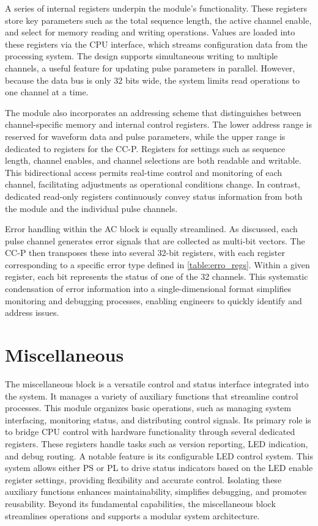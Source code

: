 A series of internal registers underpin the module's functionality. These registers store key parameters such as the total sequence length, the active channel enable, and select for memory reading and writing operations. Values are loaded into these registers via the CPU interface, which streams configuration data from the processing system. The design supports simultaneous writing to multiple channels, a useful feature for updating pulse parameters in parallel. However, because the data bus is only 32 bits wide, the system limits read operations to one channel at a time.

The module also incorporates an addressing scheme that distinguishes between channel-specific memory and internal control registers. The lower address range is reserved for waveform data and pulse parameters, while the upper range is dedicated to registers for the CC-P. Registers for settings such as sequence length, channel enables, and channel selections are both readable and writable. This bidirectional access permits real-time control and monitoring of each channel, facilitating adjustments as operational conditions change. In contrast, dedicated read-only registers continuously convey status information from both the module and the individual pulse channels.

Error handling within the AC block is equally streamlined. As discussed, each pulse channel generates error signals that are collected as multi-bit vectors. The CC-P then transposes these into several 32-bit registers, with each register corresponding to a specific error type defined in \autoref{table:erro_regs}. Within a given register, each bit represents the status of one of the 32 channels. This systematic condensation of error information into a single-dimensional format simplifies monitoring and debugging processes, enabling engineers to quickly identify and address issues.

\section{Miscellaneous}

The miscellaneous block is a versatile control and status interface integrated into the system. It manages a variety of auxiliary functions that streamline control processes. This module organizes basic operations, such as managing system interfacing, monitoring status, and distributing control signals. Its primary role is to bridge CPU control with hardware functionality through several dedicated registers. These registers handle tasks such as version reporting, LED indication, and debug routing. A notable feature is its configurable LED control system. This system allows either PS or PL to drive status indicators based on the LED enable register settings, providing flexibility and accurate control. Isolating these auxiliary functions enhances maintainability, simplifies debugging, and promotes reusability. Beyond its fundamental capabilities, the miscellaneous block streamlines operations and supports a modular system architecture.

